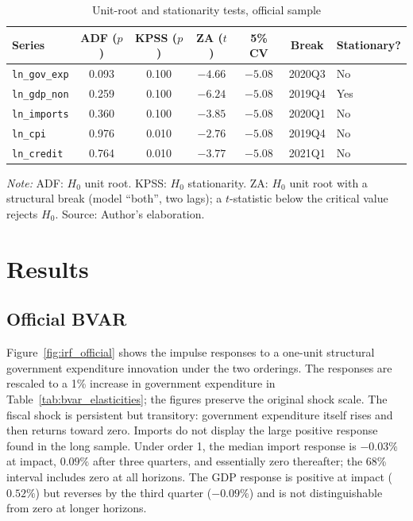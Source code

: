 \documentclass[11pt,a4paper]{article}
\begin{document}
\begin{table}[htbp]
\centering
\small
\caption{Unit-root and stationarity tests, official sample}
\label{tab:stationarity}
\begin{tabular}{@{}lcccccl@{}}
\toprule
Series & ADF ($p$) & KPSS ($p$) & ZA ($t$) & 5\% CV & Break & Stationary? \\
\midrule
\texttt{ln\_gov\_exp} & 0.093 & 0.100 & $-4.66$ & $-5.08$ & 2020Q3 & No \\
\texttt{ln\_gdp\_non} & 0.259 & 0.100 & $-6.24$ & $-5.08$ & 2019Q4 & Yes \\
\texttt{ln\_imports} & 0.360 & 0.100 & $-3.85$ & $-5.08$ & 2020Q1 & No \\
\texttt{ln\_cpi} & 0.976 & 0.010 & $-2.76$ & $-5.08$ & 2019Q4 & No \\
\texttt{ln\_credit} & 0.764 & 0.010 & $-3.77$ & $-5.08$ & 2021Q1 & No \\
\bottomrule
\end{tabular}
\par\vspace{0.3em}
\begin{minipage}{0.95\textwidth}
\footnotesize\textit{Note:} ADF: $H_0$ unit root. KPSS: $H_0$ stationarity. ZA: $H_0$ unit root with a structural break (model ``both'', two lags); a $t$-statistic below the critical value rejects $H_0$. Source: Author's elaboration.
\end{minipage}
\end{table}

\section{Results}
\label{sec:results}

\subsection{Official BVAR}
\label{sec:official_bvar}

Figure~\ref{fig:irf_official} shows the impulse responses to a one-unit structural government expenditure innovation under the two orderings. The responses are rescaled to a 1\% increase in government expenditure in Table~\ref{tab:bvar_elasticities}; the figures preserve the original shock scale. The fiscal shock is persistent but transitory: government expenditure itself rises and then returns toward zero. Imports do not display the large positive response found in the long sample. Under order 1, the median import response is $-0.03\%$ at impact, $0.09\%$ after three quarters, and essentially zero thereafter; the 68\% interval includes zero at all horizons. The GDP response is positive at impact ($0.52\%$) but reverses by the third quarter ($-0.09\%$) and is not distinguishable from zero at longer horizons.
\end{document}
